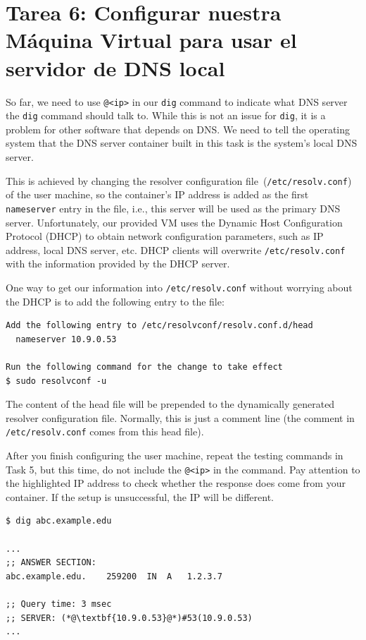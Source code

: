 \section{Tarea 6: Configurar nuestra Máquina Virtual para usar el servidor de DNS local} 

So far, we need to use \texttt{@<ip>} in our \texttt{dig} command
to indicate what DNS server the \texttt{dig} command should talk to. While this 
is not an issue for \texttt{dig}, it is a problem for other software that 
depends on DNS. We need to tell the operating system that the 
DNS server container built in this task is the system's 
local DNS server. 

This is achieved by changing
the resolver configuration file~(\texttt{/etc/resolv.conf}) of the user machine,
so the container's IP address is added as the first \texttt{nameserver} entry in the file, i.e.,
this server will be used as the primary DNS server.
Unfortunately, our provided VM uses the Dynamic Host Configuration Protocol (DHCP) to obtain
network configuration parameters, such as IP address, local DNS server, etc.
DHCP clients will overwrite \texttt{/etc/resolv.conf} with the information
provided by the DHCP server.

One way to get our information into \texttt{/etc/resolv.conf} without worrying about
the DHCP is to add the following entry to the 
file:

\begin{lstlisting}
Add the following entry to /etc/resolvconf/resolv.conf.d/head
  nameserver 10.9.0.53

Run the following command for the change to take effect
$ sudo resolvconf -u
\end{lstlisting}

The content of the head file will be prepended to the dynamically generated resolver
configuration file. Normally, this is just a comment line (the comment in
\texttt{/etc/resolv.conf} comes from this head file).


After you finish configuring the user machine, repeat 
the testing commands in Task 5, but this time, do not 
include the \texttt{@<ip>} in the command. Pay attention to 
the highlighted IP address to check whether the response does 
come from your container. If the setup is unsuccessful,
the IP will be different.

\begin{lstlisting}
$ dig abc.example.edu

...
;; ANSWER SECTION:
abc.example.edu.	259200	IN	A	1.2.3.7

;; Query time: 3 msec
;; SERVER: (*@\textbf{10.9.0.53}@*)#53(10.9.0.53)
...
\end{lstlisting}
 

